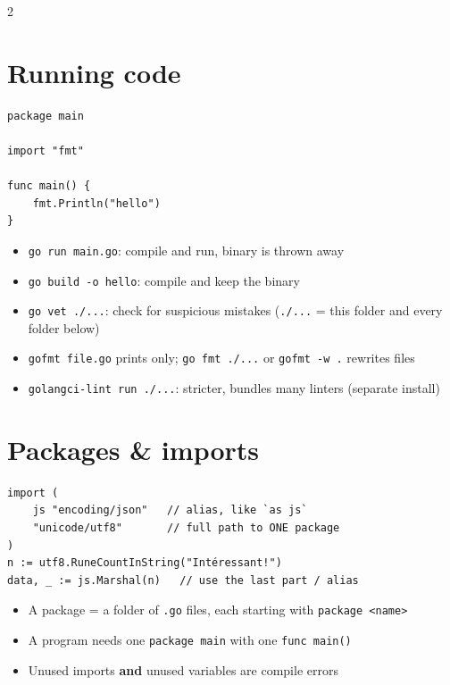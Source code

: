 \documentclass[9pt]{extarticle}
\newcommand{\kw}[1]{\textcolor{accent}{\texttt{#1}}}
\begin{document}
\begin{multicols*}{2}
\section{Running code}
\begin{lstlisting}
package main

import "fmt"

func main() {
    fmt.Println("hello")
}
\end{lstlisting}
\begin{itemize}
  \item \kw{go run main.go}: compile and run, binary is thrown away
  \item \kw{go build -o hello}: compile and keep the binary
  \item \kw{go vet ./...}: check for suspicious mistakes (\kw{./...} = this folder and every folder below)
  \item \kw{gofmt file.go} prints only; \kw{go fmt ./...} or \kw{gofmt -w .} rewrites files
  \item \kw{golangci-lint run ./...}: stricter, bundles many linters (separate install)
\end{itemize}

\section{Packages \& imports}
\begin{lstlisting}
import (
    js "encoding/json"   // alias, like `as js`
    "unicode/utf8"       // full path to ONE package
)
n := utf8.RuneCountInString("Intéressant!")
data, _ := js.Marshal(n)   // use the last part / alias
\end{lstlisting}
\begin{itemize}
  \item A package = a folder of \kw{.go} files, each starting with \kw{package <name>}
  \item A program needs one \kw{package main} with one \kw{func main()}
  \item Unused imports \textbf{and} unused variables are compile errors
\end{itemize}


\end{multicols*}
\end{document}

